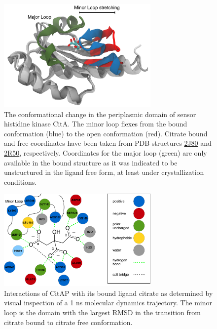 \documentclass[english, a4paper, 12pt, titlepage, draft]{article}
\newcommand{\PDB}[1]{\href{http://pdb.rcsb.org/pdb/explore/explore.do?structureId=#1}{#1}}
\begin{document}
\begin{figure}
    \centering
    \includegraphics[width=0.7\textwidth]{figures/CitAP_conf_change/CitAP_conf_change.pdf}
    \caption{The conformational change in the periplasmic domain of sensor histidine kinase CitA.
    The minor loop flexes from the bound conformation (blue) to the open conformation (red).
    Citrate bound and free coordinates have been taken from PDB structures \PDB{2J80} and \PDB{2R50}, respectively.
    Coordinates for the major loop (green) are only available in the bound structure as it was indicated to be unstructured in the ligand free form, at least under crystallization conditions.}
    \label{fig:CitA_opening}
\end{figure}     



\begin{figure}
    \centering
    \includegraphics[width=0.7\textwidth]{figures/citrate_interactions/citrate_interactions.pdf}
    \caption{Interactions of CitAP with its bound ligand citrate as determined by visual inspection of a 1 ns molecular dynamics trajectory. The minor loop is the domain with the largest RMSD in the transition from citrate bound to citrate free conformation.}
    \label{fig:citrate_interactions}
\end{figure}      
\end{document}
